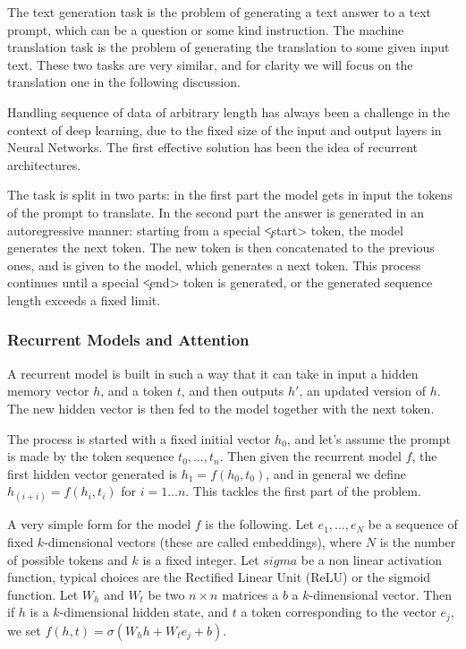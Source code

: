 \documentclass[]{marticle}
\begin{document}
The text generation task is the problem of generating a text answer to a text prompt, which can be a
question or some kind instruction. The machine translation task is the problem of generating the
translation to some given input text. These two tasks are very similar, and for clarity we will
focus on the translation one  in the following discussion.

Handling sequence of data of arbitrary length has always been a challenge in the context of deep
learning, due to the fixed size of the input and output layers in Neural Networks. The first
effective solution has been the idea of recurrent architectures.

The task is split in two parts: in the first part the model gets in input the tokens of the prompt
to translate. In the second part the answer is generated in an autoregressive manner: starting from
a special \c{<start>} token, the model generates the next token. The new token is then concatenated to
the previous ones, and is given to the model, which generates a next token. This process continues
until a special \c{<end>} token is generated, or the generated sequence length exceeds a fixed limit.

\subsubsection{Recurrent Models and Attention}

A recurrent model is built in such a way that it can take in input a hidden memory vector $h$, and a
token $t$, and then outputs $h'$, an updated version of $h$. The new hidden vector is then fed to
the model together with the next token.

The process is started with a fixed initial vector $h_0$, and let's assume the prompt is made by the
token sequence $t_0, \dots, t_n$. Then given the recurrent model $f$, the first hidden vector
generated is $h_1 = f(h_0, t_0)$, and in general we define $h_(i+i) = f(h_i, t_i)$ for $i=1\dots n$.
This tackles the first part of the problem. 

A very simple form for the model $f$ is the following. Let $e_1, \dots, e_N$ be a sequence of fixed
$k$-dimensional vectors (these are called embeddings), where $N$ is the number of possible tokens
and $k$ is a fixed integer. Let $sigma$ be a non linear activation function, typical choices are the
Rectified Linear Unit (ReLU) or the sigmoid function. Let $W_h$ and $W_t$ be two $n \times n$
matrices a $b$ a $k$-dimensional vector. Then if $h$ is a $k$-dimensional hidden state, and $t$ a
token corresponding to the vector $e_j$, we set $f(h,t) = \sigma(W_h h + W_t e_j + b)$.
\end{document}
